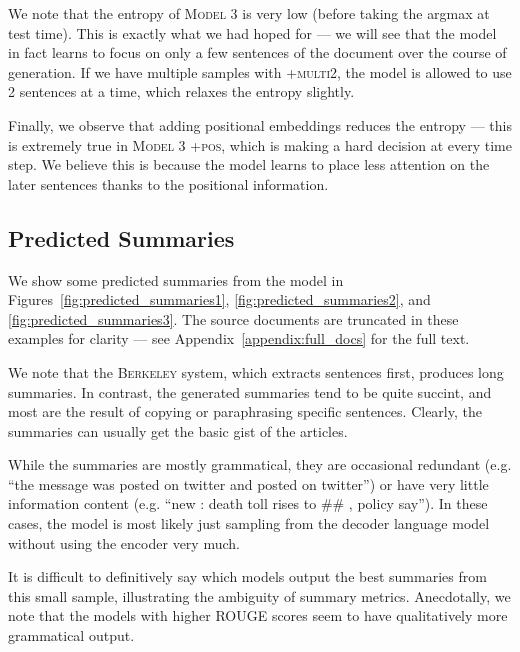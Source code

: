 \documentclass[12pt]{report}
\begin{document}
We note that the entropy of \textsc{Model 3} is very low (before taking the argmax at test time). This is exactly what we had hoped for --- we will see that the model in fact learns to focus on only a few sentences of the document over the course of generation. If we have multiple samples with \textsc{+multi2}, the model is allowed to use 2 sentences at a time, which relaxes the entropy slightly.


Finally, we observe that adding positional embeddings reduces the entropy --- this is extremely true in \textsc{Model 3 +pos}, which is making a hard decision at every time step. We believe this is because the model learns to place less attention on the later sentences thanks to the positional information.




\subsection{Predicted Summaries}
We show some predicted summaries from the model in Figures~\ref{fig:predicted_summaries1}, \ref{fig:predicted_summaries2}, and \ref{fig:predicted_summaries3}.
The source documents are truncated in these examples for clarity --- see Appendix~\ref{appendix:full_docs} for the full text.

We note that the \textsc{Berkeley} system, which extracts sentences first, produces long summaries. In contrast, the generated summaries tend to be quite succint, and most are the result of copying or paraphrasing specific sentences. Clearly, the summaries can usually get the basic gist of the articles. 

While the summaries are mostly grammatical, they are occasional redundant (e.g. ``the message was posted on twitter and posted on twitter'') or have very little information content (e.g. ``new : death toll rises to \#\# , policy say''). In these cases, the model is most likely just sampling from the decoder language model without using the encoder very much.

It is difficult to definitively say which models output the best summaries from this small sample, illustrating the ambiguity of summary metrics. Anecdotally, we note that the models with higher ROUGE scores seem to have qualitatively more grammatical output.
\end{document}
